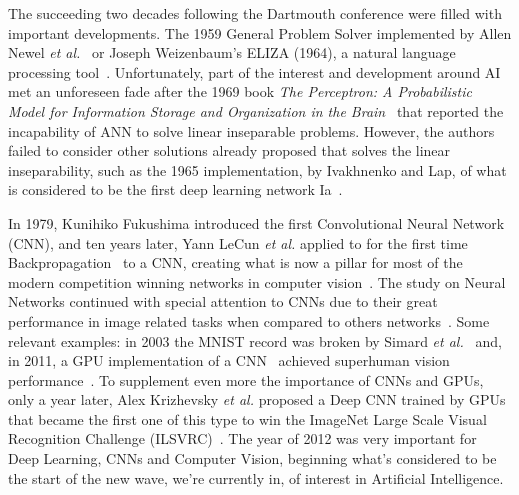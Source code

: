 \documentclass[class=report, crop=false, a4paper, 12pt]{standalone}
\begin{document}
\par The succeeding two decades following the Dartmouth conference were filled with important developments. The 1959 General Problem Solver implemented by Allen Newel \textit{et al.}~\autocite{newell1959report} or Joseph Weizenbaum's ELIZA (1964), a natural language processing tool~\autocite{weizenbaumELIZAComputerProgram1966}. Unfortunately, part of the interest and development around AI met an unforeseen fade after the 1969 book \textit{The Perceptron: A Probabilistic Model for Information Storage and Organization in the Brain}~\autocite{minsky69perceptrons} that reported the incapability of ANN to solve linear inseparable problems. However, the authors failed to consider other solutions already proposed that solves the linear inseparability, such as the 1965 implementation, by Ivakhnenko and Lap, of what is considered to be the first deep learning network Ia~\autocite{ivakhnenkoCyberneticPredictingDevices}.

\par In 1979, Kunihiko Fukushima introduced the first Convolutional Neural Network (CNN), and ten years later, Yann LeCun \textit{et al.} applied to for the first time Backpropagation~\autocite{6795724} to a CNN, creating what is now a pillar for most of the modern competition winning networks in computer vision~\autocite{schmidhuberDeepLearningNeural2015}. The study on Neural Networks continued with special attention to CNNs due to their great performance in image related tasks when compared to others networks~\autocite{lecunGradientBasedLearningApplied1998}. Some relevant examples: in 2003 the MNIST record was broken by Simard \textit{et al.}~\autocite{simardBestPracticesConvolutional2003} and, in 2011, a GPU implementation of a CNN~\autocite{ciresanCommitteeNeuralNetworks2011} achieved superhuman vision performance~\autocite{stallkampManVsComputer2012}. To supplement even more the importance of CNNs and GPUs, only a year later, Alex Krizhevsky \textit{et al.} proposed a Deep CNN trained by GPUs that became the first one of this type to win the ImageNet Large Scale Visual Recognition Challenge (ILSVRC)~\autocite{krizhevskyImageNetClassificationDeep2012}. The year of 2012 was very important for Deep Learning, CNNs and Computer Vision, beginning what's considered to be the start of the new wave, we're currently in, of interest in Artificial Intelligence. 
\end{document}
